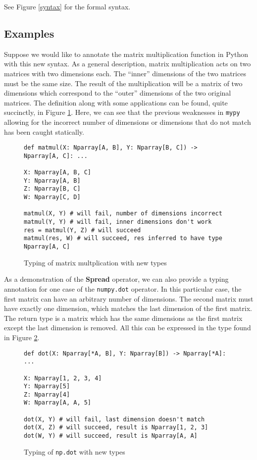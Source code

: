 \documentclass{report}
\begin{document}
See Figure \ref{syntax} for the formal syntax.

\subsection{Examples}

Suppose we would like to annotate the matrix multiplication function in Python with this new syntax. As a general description, matrix multiplication acts on two matrices with two dimensions each. The ``inner'' dimensions of the two matrices must be the same size. The result of the multiplication will be a matrix of two dimensions which correspond to the ``outer'' dimensions of the two original matrices. The definition along with some applications can be found, quite succinctly, in Figure \ref{np-type-matmul}. Here, we can see that the previous weaknesses in \texttt{mypy} allowing for the incorrect number of dimensions or dimensions that do not match has been caught statically.

\begin{figure}
    \centering
    \begin{verbatim}
def matmul(X: Nparray[A, B], Y: Nparray[B, C]) -> Nparray[A, C]: ...

X: Nparray[A, B, C]
Y: Nparray[A, B]
Z: Nparray[B, C]
W: Nparray[C, D]

matmul(X, Y) # will fail, number of dimensions incorrect
matmul(Y, Y) # will fail, inner dimensions don't work
res = matmul(Y, Z) # will succeed
matmul(res, W) # will succeed, res inferred to have type Nparray[A, C]\end{verbatim}
    \caption{Typing of matrix multplication with new types}
    \label{np-type-matmul}
\end{figure}

As a demonstration of the \textbf{Spread} operator, we can also provide a typing annotation for one case of the \texttt{numpy.dot} operator. In this particular case, the first matrix can have an arbitrary number of dimensions. The second matrix must have exactly one dimension, which matches the last dimension of the first matrix. The return type is a matrix which has the same dimensions as the first matrix except the last dimension is removed. All this can be expressed in the type found in Figure \ref{np-type-dot}.

\begin{figure}
    \begin{verbatim}
def dot(X: Nparray[*A, B], Y: Nparray[B]) -> Nparray[*A]: ...

X: Nparray[1, 2, 3, 4]
Y: Nparray[5]
Z: Nparray[4]
W: Nparray[A, A, 5]

dot(X, Y) # will fail, last dimension doesn't match
dot(X, Z) # will succeed, result is Nparray[1, 2, 3]
dot(W, Y) # will succeed, result is Nparray[A, A]\end{verbatim}
    \caption{Typing of \texttt{np.dot} with new types}
    \label{np-type-dot}
\end{figure}
\end{document}
